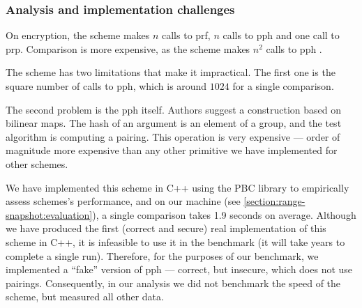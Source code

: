 	\subsubsection{Analysis and implementation challenges}

		On encryption, the scheme makes $n$ calls to \acrshort{prf}, $n$ calls to \acrshort{pph}  and one call to \acrshort{prp}.
		Comparison is more expensive, as the scheme makes $n^2$ calls to \acrshort{pph} .

		The scheme has two limitations that make it impractical.
		The first one is the square number of calls to \acrshort{pph}, which is around $1024$ for a single comparison.

		The second problem is the \acrshort{pph} itself.
		Authors suggest a construction based on bilinear maps.
		The hash of an argument is an element of a group, and the test algorithm is computing a pairing.
		This operation is very expensive --- order of magnitude more expensive than any other primitive we have implemented for other schemes.

		We have implemented this scheme in C++ using the PBC library \cite{pbc} to empirically assess schemes's performance, and on our machine (see \cref{section:range-snapshot:evaluation}), a single comparison takes 1.9 seconds on average.
		Although we have produced the first (correct and secure) real implementation of this scheme in C++, it is infeasible to use it in the benchmark (it will take years to complete a single run).
		Therefore, for the purposes of our benchmark, we implemented a ``fake'' version of \acrshort{pph} --- correct, but insecure, which does not use pairings.
		Consequently, in our analysis we did not benchmark the speed of the scheme, but measured all other data.
